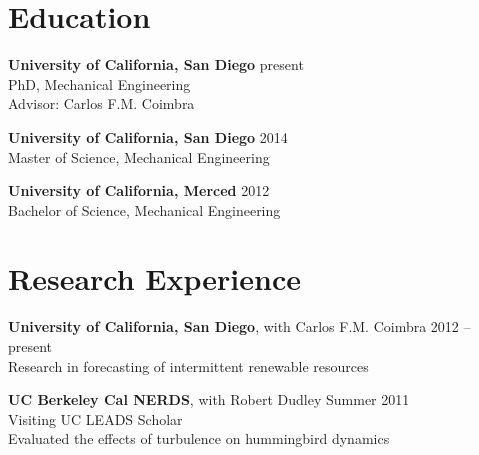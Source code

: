 \documentclass[]{res}
\begin{document}
\address{9500 Gilman Drive \\ La Jolla, CA 92093--0411}
\address{dplarson@ucsd.edu}

\begin{resume}


\section{Education}
\vspace{0.1in}

\textbf{University of California, San Diego} \hfill present \\
PhD, Mechanical Engineering \\
Advisor: Carlos F.M. Coimbra \\

\vspace{-0.2in}

\textbf{University of California, San Diego} \hfill 2014 \\
Master of Science, Mechanical Engineering \\

\vspace{-0.2in}

\textbf{University of California, Merced} \hfill 2012 \\
Bachelor of Science, Mechanical Engineering \\


\section{Research Experience}
\vspace{0.1in}

\textbf{University of California, San Diego}, with Carlos F.M. Coimbra \hfill 2012 -- present\\
Research in forecasting of intermittent renewable resources \\

\vspace{-0.2in}

\textbf{UC Berkeley Cal NERDS}, with Robert Dudley \hfill Summer 2011 \\
Visiting UC LEADS Scholar \\
Evaluated the effects of turbulence on hummingbird dynamics \\




\end{resume}
\end{document}
